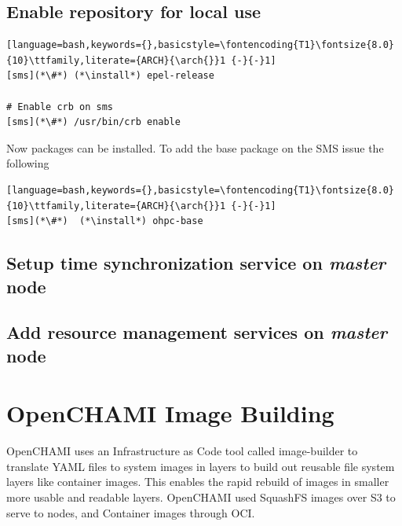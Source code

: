 \documentclass{ohpc-doc}
\newcommand{\arch}{x86\_64}
\newcommand{\install}{dnf -y install}
\begin{document}
\section{Enable \OHPC{} repository for local use}\label{sec:enable_repo}






\begin{lstlisting}[language=bash,keywords={},basicstyle=\fontencoding{T1}\fontsize{8.0}{10}\ttfamily,literate={ARCH}{\arch{}}1 {-}{-}1]
[sms](*\#*) (*\install*) epel-release

# Enable crb on sms
[sms](*\#*) /usr/bin/crb enable
\end{lstlisting}

Now \OHPC{} packages can be installed. To add the base package on the SMS
issue the following
\begin{lstlisting}[language=bash,keywords={},basicstyle=\fontencoding{T1}\fontsize{8.0}{10}\ttfamily,literate={ARCH}{\arch{}}1 {-}{-}1]
[sms](*\#*)  (*\install*) ohpc-base
\end{lstlisting}



\section{Setup time synchronization service on {\em master} node}\label{sec:add_ntp}



\section{Add resource management services on {\em master} node}\label{sec:add_rm}


\chapter{OpenCHAMI Image Building}\label{sec:image_building}
OpenCHAMI uses an Infrastructure as Code tool called image-builder to translate
YAML files to system images in layers to build out reusable file system layers
like container images.  This enables the rapid rebuild of images in smaller
more usable and readable layers.
OpenCHAMI used SquashFS images over S3 to serve to nodes, and Container images
through OCI.
\end{document}
